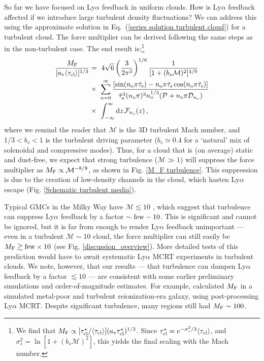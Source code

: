 \documentclass[fleqn,usenatbib]{mnras}
\newcommand{\taucl}{\tau_{\rm cl}}
\begin{document}
So far we have focused on Ly$\alpha$ feedback in uniform clouds. How is Ly$\alpha$ feedback affected if we introduce large turbulent density fluctuations? We can address this using the approximate solution in Eq.~(\ref{series solution turbulent cloud}) for a turbulent cloud. The force multiplier can be derived following the same steps as in the non-turbulent case. The end result is:\footnote{We find that $M_{\rm F} \propto [\taucl^{\star}/\langle \taucl \rangle](a_{\rm v} \taucl^{\star})^{1/3}$. Since $\taucl^{\star} = e^{-\sigma_s^2/3} \langle \taucl \rangle$, and $\sigma_s^2 = \ln[1 + (b_s \mathcal{M})^2]$, this yields the final scaling with the Mach number. }
\begin{align}
    \dfrac{M_{\rm F}}{[a_{\rm v} \langle \taucl \rangle]^{1/3}} &=~ 4\sqrt{6} \left( \dfrac{3}{2 \pi^3} \right)^{1/6} \dfrac{1}{[1 + (b_s \mathcal{M})^2]^{4/9}}  \nonumber \\ &\times~  \sum_{n = 0}^{\infty} \dfrac{[\sin(n_{\rm o} \pi \Bar{\tau}_{\rm s}) - n_{\rm o}\pi \Bar{\tau}_{\rm s}\cos(n_{\rm o} \pi \Bar{\tau}_{\rm s})]}{\Bar{\tau}_{\rm s}^3 (n_{\rm o}\pi)^3 n_{\rm o}^{1/3} (\mathcal{P} + n_{\rm o} \pi \mathcal{D}_{n_{\rm o}})} \label{M_F general turbulence} \\ &\times~ \int_{-\infty}^{\infty} \textrm{d}z \hspace{1 pt} \mathcal{F}_{n_{\rm o}}(z) \,  \nonumber,
\end{align}
where we remind the reader that $\mathcal{M}$ is the 3D turbulent Mach number, and $1/3 < b_s < 1$ is the turbulent driving parameter ($b_s \simeq 0.4$ for a `natural' mix of solenoidal and compressive modes). Thus, for a cloud that is (on average) static and dust-free, we expect that strong turbulence ($\mathcal{M} \gg 1$) will suppress the force multiplier as $M_{\rm F} \propto \mathcal{M}^{-8/9}$, as shown in Fig. \ref{M_F turbulence}. This suppression is due to the creation of low-density channels in the cloud, which hasten Ly$\alpha$ escape (Fig. \ref{Schematic turbulent media}). 

Typical GMCs in the Milky Way have $\mathcal{M} \lesssim 10$ \citep{Heyer2015, Syed2020, Wang2020}, which suggest that turbulence can suppress Ly$\alpha$ feedback by a factor $\sim \rm few - 10$. This is significant and cannot be ignored, but it is far from enough to render Ly$\alpha$ feedback unimportant --- even in a turbulent $\mathcal{M} \sim 10$ cloud, the force multiplier can still easily be $M_{\rm F} \gtrsim \textrm{few} \times 10$ (see Fig. \ref{discussion_overview}). More detailed tests of this prediction would have to await systematic Ly$\alpha$ MCRT experiments in turbulent clouds. We note, however, that our results --- that turbulence can dampen Ly$\alpha$ feedback by a factor $\lesssim 10$ --- are consistent with some earlier preliminary simulations and order-of-magnitude estimates. For example, \cite{Smith2019} calculated $M_{\rm F}$ in a simulated metal-poor and turbulent reionization-era galaxy, using post-processing Ly$\alpha$ MCRT. Despite significant turbulence, many regions still had $M_{\rm F} \sim 100$. 
\end{document}
